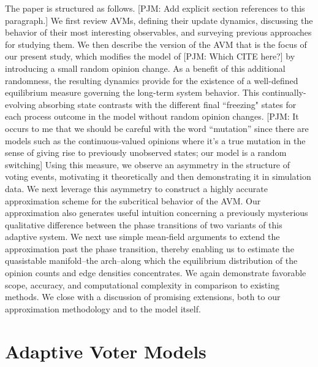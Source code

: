 \documentclass[review, onefignum, onetabnum]{siamart171218}
\newcommand{\pjm}[1]{{\color{blue}[PJM: #1]}}
\begin{document}
	The paper is structured as follows. \pjm{Add explicit section references to this paragraph.}
	We first review AVMs, defining their update dynamics, discussing the behavior of their most interesting observables, and surveying previous approaches for studying them. 
	We then describe the version of the AVM that is the focus of our present study, which modifies the model of \pjm{Which CITE here?} by introducing a small random opinion change. As a benefit of this additional randomness, the resulting dynamics provide for the existence of a well-defined equilibrium measure governing the long-term system behavior. This continually-evolving absorbing state contrasts with the different final ``freezing" states for each process outcome in the model without random opinion changes. \pjm{It occurs to me that we should be careful with the word ``mutation'' since there are models such as the continuous-valued opinions where it's a true mutation in the sense of giving rise to previously unobserved states; our model is a random switching}
	Using this measure, we observe an asymmetry in the structure of voting events, motivating it theoretically and then demonstrating it in simulation data. 
	We next leverage this asymmetry to construct a highly accurate approximation scheme for the subcritical behavior of the AVM. 
	Our approximation also generates useful intuition concerning a previously mysterious qualitative difference between the phase transitions of two variants of this adaptive system.
	We next use simple mean-field arguments to extend the approximation past the phase transition, thereby enabling us to estimate the quasistable manifold--the arch--along which the equilibrium distribution of the opinion counts and edge densities concentrates.
	We again demonstrate favorable scope, accuracy, and computational complexity in comparison to existing methods.
	We close with a discussion of promising extensions, both to our approximation methodology and to the model itself. 
	
\section{Adaptive Voter Models} \label{sec:AVMs}
\end{document}
